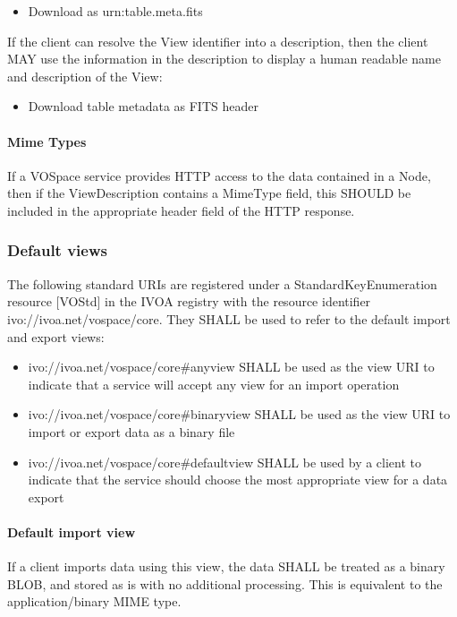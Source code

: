 \documentclass[11pt,a4paper]{ivoa}
\begin{document}
\begin{itemize}
    \item Download as urn:table.meta.fits
\end{itemize}

If the client can resolve the View identifier into a description, then the client MAY use the information in the description to display a human readable name and description of the View:

\begin{itemize}
    \item Download table metadata as FITS header
\end{itemize}

\paragraph{Mime Types}
If a VOSpace service provides HTTP access to the data contained in a Node, then if the ViewDescription contains a MimeType field, this SHOULD be included in the appropriate header field of the HTTP response.

\subsubsection{Default views}
The following standard URIs are registered under a StandardKeyEnumeration resource [VOStd] in the IVOA registry with the resource identifier ivo://ivoa.net/vospace/core. They SHALL be used to refer to the default import and export views:

\begin{itemize}
    \item ivo://ivoa.net/vospace/core\#anyview SHALL be used as the view URI to indicate that a service will accept any view for an import operation
    \item ivo://ivoa.net/vospace/core\#binaryview SHALL be used as the view URI to import or export data as a binary file
    \item ivo://ivoa.net/vospace/core\#defaultview SHALL be used by a client to indicate that the service should choose the most appropriate view for a data export
\end{itemize}

\paragraph{Default import view}
If a client imports data using this view, the data SHALL be treated as a binary BLOB, and stored as is with no additional processing. This is equivalent to the application/binary MIME type.
\end{document}
